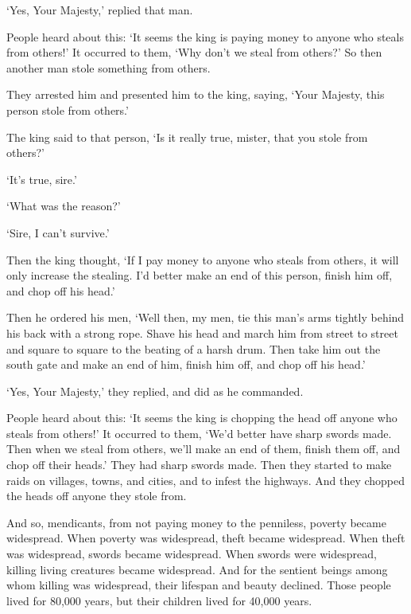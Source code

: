 \documentclass[12pt,openany]{book}%
\begin{document}
‘Yes, Your Majesty,’ replied that man. 

People heard about this: ‘It seems the king is paying money to anyone who steals from others!’ It occurred to them, ‘Why don’t we steal from others?’ So then another man stole something from others. 

They arrested him and presented him to the king, saying, ‘Your Majesty, this person stole from others.’ 

The king said to that person, ‘Is it really true, mister, that you stole from others?’ 

‘It’s true, sire.’ 

‘What was the reason?’ 

‘Sire, I can’t survive.’ 

Then the king thought, ‘If I pay money to anyone who steals from others, it will only increase the stealing. I’d better make an end of this person, finish him off, and chop off his head.’ 

Then he ordered his men, ‘Well then, my men, tie this man’s arms tightly behind his back with a strong rope. Shave his head and march him from street to street and square to square to the beating of a harsh drum. Then take him out the south gate and make an end of him, finish him off, and chop off his head.’ 

‘Yes, Your Majesty,’ they replied, and did as he commanded. 

People heard about this: ‘It seems the king is chopping the head off anyone who steals from others!’ It occurred to them, ‘We’d better have sharp swords made. Then when we steal from others, we’ll make an end of them, finish them off, and chop off their heads.’ They had sharp swords made. Then they started to make raids on villages, towns, and cities, and to infest the highways. And they chopped the heads off anyone they stole from. 

And so, mendicants, from not paying money to the penniless, poverty became widespread. When poverty was widespread, theft became widespread. When theft was widespread, swords became widespread. When swords were widespread, killing living creatures became widespread. And for the sentient beings among whom killing was widespread, their lifespan and beauty declined. Those people lived for 80,000 years, but their children lived for 40,000 years. 
\end{document}
